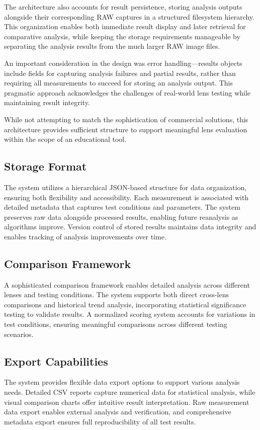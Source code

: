 The architecture also accounts for result persistence, storing analysis outputs alongside their corresponding RAW captures in a structured filesystem hierarchy. This organization enables both immediate result display and later retrieval for comparative analysis, while keeping the storage requirements manageable by separating the analysis results from the much larger RAW image files.

An important consideration in the design was error handling---results objects include fields for capturing analysis failures and partial results, rather than requiring all measurements to succeed for storing an analysis output. This pragmatic approach acknowledges the challenges of real-world lens testing while maintaining result integrity.

While not attempting to match the sophistication of commercial solutions, this architecture provides sufficient structure to support meaningful lens evaluation within the scope of an educational tool.

\subsection{Storage Format}
The system utilizes a hierarchical JSON-based structure for data organization, ensuring both flexibility and accessibility. Each measurement is associated with detailed metadata that captures test conditions and parameters. The system preserves raw data alongside processed results, enabling future reanalysis as algorithms improve. Version control of stored results maintains data integrity and enables tracking of analysis improvements over time.

\subsection{Comparison Framework}
A sophisticated comparison framework enables detailed analysis across different lenses and testing conditions. The system supports both direct cross-lens comparisons and historical trend analysis, incorporating statistical significance testing to validate results. A normalized scoring system accounts for variations in test conditions, ensuring meaningful comparisons across different testing scenarios.

\subsection{Export Capabilities}
The system provides flexible data export options to support various analysis needs. Detailed CSV reports capture numerical data for statistical analysis, while visual comparison charts offer intuitive result interpretation. Raw measurement data export enables external analysis and verification, and comprehensive metadata export ensures full reproducibility of all test results.

